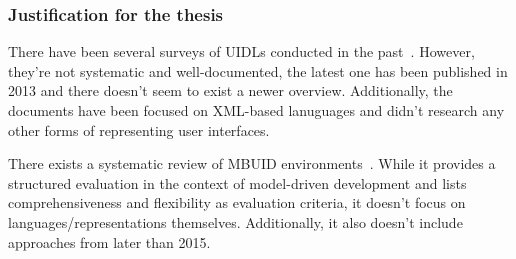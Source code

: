 \subsubsection{Justification for the thesis}
There have been several surveys of UIDLs conducted in the past~\cite{souchon_review_2003, guerrero_garcia_theoretical_2009, guerrero_garcia_theoretical_2011, Jovanovic2013}.
However, they’re not systematic and well-documented, the latest one has been published in 2013 and there doesn’t seem to exist a newer overview.
Additionally, the documents have been focused on XML-based lanuguages and didn’t research any other forms of representing user interfaces.

There exists a systematic review of MBUID environments~\cite{Ruiz2018}.
While it provides a structured evaluation in the context of model-driven development and lists comprehensiveness and flexibility as evaluation criteria, it doesn’t focus on languages/representations themselves.
Additionally, it also doesn’t include approaches from later than 2015.
